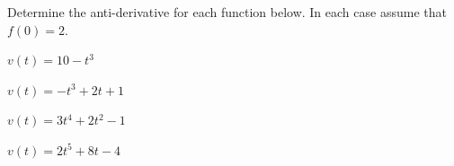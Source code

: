 
\begin{problem}
\item Determine the anti-derivative for each function below. In each
  case assume that $f(0)=2$.
  \begin{subproblem}
  \item $v(t)= 10 - t^3$
    \vfill
  \item $v(t)= -t^3+2t+1$
    \vfill
  \item $v(t)= 3 t^4 + 2 t^2 - 1$
    \vfill
  \item $v(t)= 2t^5 + 8t - 4$
    \vfill
  \end{subproblem}
\end{problem}


